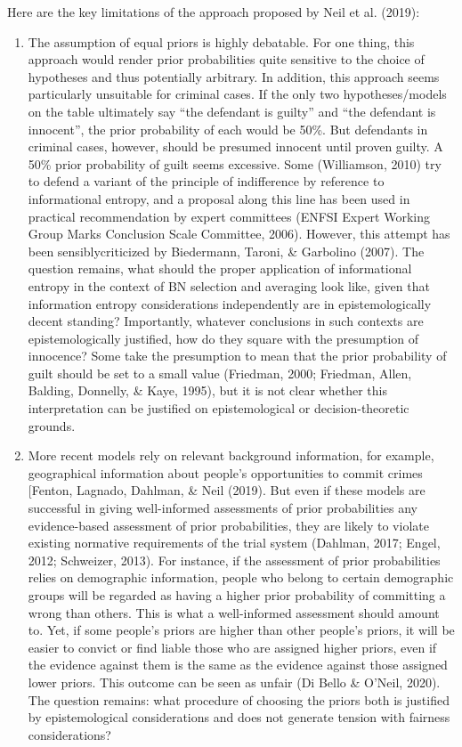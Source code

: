\documentclass[11pt,dvipsnames,enabledeprecatedfontcommands]{scrartcl}
\begin{document}
Here are the key limitations of the approach proposed by Neil et al.
(2019):

\begin{enumerate}
\def\labelenumi{\Alph{enumi}.}
\setcounter{enumi}{4}
\item
  The assumption of equal priors is highly debatable. For one thing,
  this approach would render prior probabilities quite sensitive to the
  choice of hypotheses and thus potentially arbitrary. In addition, this
  approach seems particularly unsuitable for criminal cases. If the only
  two hypotheses/models on the table ultimately say ``the defendant is
  guilty'' and ``the defendant is innocent'', the prior probability of
  each would be 50\%. But defendants in criminal cases, however, should
  be presumed innocent until proven guilty. A 50\% prior probability of
  guilt seems excessive. Some (Williamson, 2010) try to defend a variant
  of the principle of indifference by reference to informational
  entropy, and a proposal along this line has been used in practical
  recommendation by expert committees (ENFSI Expert Working Group Marks
  Conclusion Scale Committee, 2006). However, this attempt has been
  sensiblycriticized by Biedermann, Taroni, \& Garbolino (2007). The
  question remains, what should the proper application of informational
  entropy in the context of BN selection and averaging look like, given
  that information entropy considerations independently are in
  epistemologically decent standing? Importantly, whatever conclusions
  in such contexts are epistemologically justified, how do they square
  with the presumption of innocence? Some take the presumption to mean
  that the prior probability of guilt should be set to a small value
  (Friedman, 2000; Friedman, Allen, Balding, Donnelly, \& Kaye, 1995),
  but it is not clear whether this interpretation can be justified on
  epistemological or decision-theoretic grounds.
\item
  More recent models rely on relevant background information, for
  example, geographical information about people's opportunities to
  commit crimes {[}Fenton, Lagnado, Dahlman, \& Neil (2019). But even if
  these models are successful in giving well-informed assessments of
  prior probabilities any evidence-based assessment of prior
  probabilities, they are likely to violate existing normative
  requirements of the trial system (Dahlman, 2017; Engel, 2012;
  Schweizer, 2013). For instance, if the assessment of prior
  probabilities relies on demographic information, people who belong to
  certain demographic groups will be regarded as having a higher prior
  probability of committing a wrong than others. This is what a
  well-informed assessment should amount to. Yet, if some people's
  priors are higher than other people's priors, it will be easier to
  convict or find liable those who are assigned higher priors, even if
  the evidence against them is the same as the evidence against those
  assigned lower priors. This outcome can be seen as unfair (Di Bello \&
  O'Neil, 2020). The question remains: what procedure of choosing the
  priors both is justified by epistemological considerations and does
  not generate tension with fairness considerations?
\end{enumerate}
\end{document}
